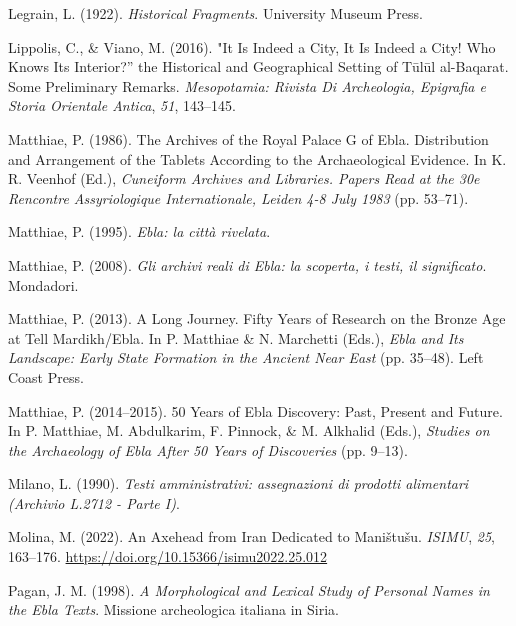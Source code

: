 \documentclass[
]{book}
\newlength{\cslhangindent}
\newlength{\cslentryspacingunit} %
\newenvironment{CSLReferences}[2] %
 {%
  \setlength{\parindent}{0pt}
  \ifodd #1
  \let\oldpar\par
  \def\par{\hangindent=\cslhangindent\oldpar}
  \fi
  \setlength{\parskip}{#2\cslentryspacingunit}
 }%
 {}
\begin{document}
\begin{CSLReferences}{1}{0}
\leavevmode{}%
Legrain, L. (1922). \emph{Historical {Fragments}}. University Museum Press.

\leavevmode{}%
Lippolis, C., \& Viano, M. (2016). "{It Is Indeed} a {City}, {It Is Indeed} a {City}! {Who Knows Its Interior}?'' the {Historical} and {Geographical Setting} of {Tūlūl} al-{Baqarat}. {Some Preliminary Remarks}. \emph{Mesopotamia: Rivista Di Archeologia, Epigrafia e Storia Orientale Antica}, \emph{51}, 143--145.

\leavevmode{}%
Matthiae, P. (1986). The {Archives} of the {Royal Palace G} of {Ebla}. {Distribution} and {Arrangement} of the {Tablets According} to the {Archaeological Evidence}. In K. R. Veenhof (Ed.), \emph{Cuneiform {Archives} and {Libraries}. {Papers Read} at the 30e {Rencontre Assyriologique Internationale}, {Leiden} 4-8 {July} 1983} (pp. 53--71).

\leavevmode{}%
Matthiae, P. (1995). \emph{Ebla: la città rivelata}.

\leavevmode{}%
Matthiae, P. (2008). \emph{Gli archivi reali di Ebla: la scoperta, i testi, il significato}. Mondadori.

\leavevmode{}%
Matthiae, P. (2013). A {Long Journey}. {Fifty Years} of {Research} on the {Bronze Age} at {Tell Mardikh}/{Ebla}. In P. Matthiae \& N. Marchetti (Eds.), \emph{Ebla and {Its Landscape}: {Early State Formation} in the {Ancient Near East}} (pp. 35--48). Left Coast Press.

\leavevmode{}%
Matthiae, P. (2014--2015). 50 {Years} of {Ebla Discovery}: {Past}, {Present} and {Future}. In P. Matthiae, M. Abdulkarim, F. Pinnock, \& M. Alkhalid (Eds.), \emph{Studies on the {Archaeology} of {Ebla After} 50 {Years} of {Discoveries}} (pp. 9--13).

\leavevmode{}%
Milano, L. (1990). \emph{Testi amministrativi: assegnazioni di prodotti alimentari (Archivio L.2712 - Parte I)}.

\leavevmode{}%
Molina, M. (2022). An {Axehead} from {Iran Dedicated} to {Maništušu}. \emph{ISIMU}, \emph{25}, 163--176. \url{https://doi.org/10.15366/isimu2022.25.012}

\leavevmode{}%
Pagan, J. M. (1998). \emph{A {Morphological} and {Lexical Study} of {Personal Names} in the {Ebla Texts}}. Missione archeologica italiana in Siria.


\end{CSLReferences}
\end{document}
